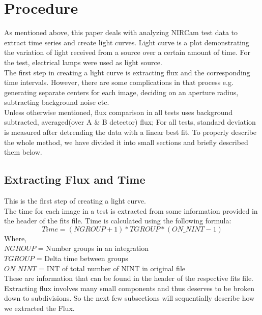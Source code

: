 \documentclass[conference]{IEEEtran}
\begin{document}
\section{Procedure}
As mentioned above, this paper deals with analyzing NIRCam test data to extract time series and create light curves. Light curve is a plot demonstrating the variation of light received from a source over a certain amount of time. For the test, electrical lamps were used as light source.\\
The first step in creating a light curve is extracting flux and the corresponding time intervals. However, there are some complications in that process e.g. generating separate centers for each image, deciding on an aperture radius, subtracting background noise etc. \\
Unless otherwise mentioned, flux comparison in all tests uses background subtracted, averaged(over A \& B detector) flux; For all tests, standard deviation is measured after detrending the data with a linear best fit. To properly describe the whole method, we have divided it into small sections and briefly described them below.   


    \subsection{Extracting Flux and Time}
    This is the first step of creating a light curve.\\
    The time for each image in a test is extracted from some information provided in the header of the fits file. Time is calculated using the following formula:
    $$Time =  (NGROUP  + 1) * TGROUP * (ON\_NINT - 1)$$ 
    Where, \\
    $NGROUP$ = Number groups in an integration\\
    $TGROUP$ = Delta time between groups\\
    $ON\_NINT$ = INT of total number of NINT in original file\\
    These are information that can be found in the header of the respective fits file. \\
    Extracting flux involves many small components and thus deserves to be broken down to subdivisions. So the next few subsections will sequentially describe how we extracted the Flux.
\end{document}
